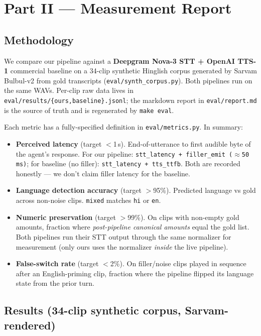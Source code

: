 \documentclass[11pt,a4paper]{article}
\begin{document}
\newpage
\section*{Part II --- Measurement Report}

\subsection*{Methodology}

We compare our pipeline against a \textbf{Deepgram Nova-3 STT + OpenAI TTS-1} commercial baseline on a 34-clip synthetic Hinglish corpus generated by Sarvam Bulbul-v2 from gold transcripts (\texttt{eval/synth\_corpus.py}). Both pipelines run on the same WAVs. Per-clip raw data lives in \texttt{eval/results/\{ours,baseline\}.jsonl}; the markdown report in \texttt{eval/report.md} is the source of truth and is regenerated by \texttt{make eval}.

Each metric has a fully-specified definition in \texttt{eval/metrics.py}. In summary:

\begin{itemize}
\item \textbf{Perceived latency} (target $<$1\,s). End-of-utterance to first audible byte of the agent's response. For our pipeline: \texttt{stt\_latency + filler\_emit ($\approx$50\,ms)}; for baseline (no filler): \texttt{stt\_latency + tts\_ttfb}. Both are recorded honestly --- we don't claim filler latency for the baseline.
\item \textbf{Language detection accuracy} (target $>$95\%). Predicted language vs gold across non-noise clips. \texttt{mixed} matches \texttt{hi} or \texttt{en}.
\item \textbf{Numeric preservation} (target $>$99\%). On clips with non-empty gold amounts, fraction where \emph{post-pipeline canonical amounts} equal the gold list. Both pipelines run their STT output through the same normalizer for measurement (only ours uses the normalizer \emph{inside} the live pipeline).
\item \textbf{False-switch rate} (target $<$2\%). On filler/noise clips played in sequence after an English-priming clip, fraction where the pipeline flipped its language state from the prior turn.
\end{itemize}

\subsection*{Results (34-clip synthetic corpus, Sarvam-rendered)}
\end{document}
